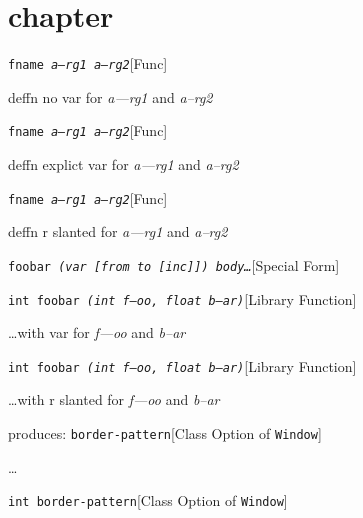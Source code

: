 \documentclass{book}
\begin{document}
\label{anchor:Top}%
\chapter{chapter}
\label{anchor:chapter}%

\noindent\texttt{fname \bgroup{}\normalfont{}\textsl{a---rg1 a--rg2}\egroup{}}\hfill[Func]



%
deffn no var for \textsl{a---rg1} and \textsl{a--rg2}

\noindent\texttt{fname \bgroup{}\normalfont{}\textsl{\textsl{a---rg1} \textsl{a--rg2}}\egroup{}}\hfill[Func]



%
deffn explict var for \textsl{a---rg1} and \textsl{a--rg2}

\noindent\texttt{fname \bgroup{}\normalfont{}\textsl{\textrm{\textsl{a---rg1}} \textrm{\textsl{a--rg2}}}\egroup{}}\hfill[Func]



%
deffn r slanted for \textsl{a---rg1} and \textsl{a--rg2}

\noindent\texttt{foobar \bgroup{}\normalfont{}\textsl{(var {[}from to {[}inc{]}{]}) body\dots{}\@}\egroup{}}\hfill[Special Form]



%

\noindent\texttt{int foobar \bgroup{}\normalfont{}\textsl{(int \textsl{f---oo}, float \textsl{b--ar})}\egroup{}}\hfill[Library Function]



%
\dots{}\@ with var for \textsl{f---oo} and \textsl{b--ar}

\noindent\texttt{int foobar \bgroup{}\normalfont{}\textsl{(int \textrm{\textsl{f---oo}}, float \textrm{\textsl{b--ar}})}\egroup{}}\hfill[Library Function]



%
\dots{}\@ with r slanted for \textsl{f---oo} and \textsl{b--ar}

\noindent{}produces:
\noindent\texttt{border-pattern}\hfill[Class Option of \texttt{Window}]



%
\dots{}\@

\noindent\texttt{\texttt{int} border-pattern}\hfill[Class Option of \texttt{Window}]
\end{document}
